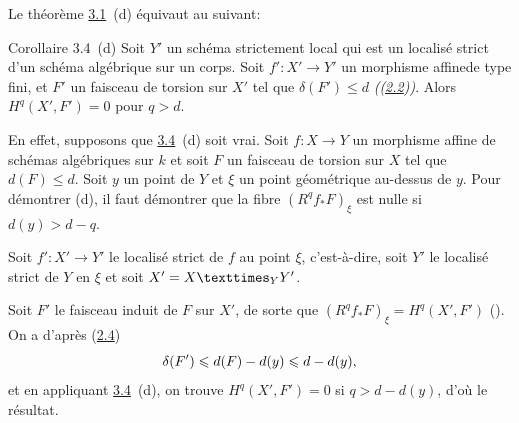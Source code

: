 \documentclass[10pt]{../fichiers-configuration-latex/smfart}
\begin{document}
Le théorème \hyperref[XIV.thm3.1]{3.1}~(d) équivaut
 au suivant:

\begin{enonce*}{Corollaire 3.4~(d)}
Soit $Y'$ un schéma strictement local qui est un localisé strict d'un
schéma algébrique sur un corps. Soit $f':X'\rightarrow Y'$ un
morphisme affine\pageoriginale de type fini, et $F'$ un faisceau de
torsion sur $X'$ tel que $\delta(F')\leq d$ \emph{(\cf (\hyperref[XIV.def2.2]{2.2}))}. Alors
$H^{q}(X',F')=0$ pour $q>d$.
\end{enonce*}

En effet, supposons que \hyperref[XIV.cor3.4]{3.4}~(d) soit vrai. Soit $f:X\rightarrow Y$ un
morphisme affine de schémas algébriques sur $k$ et soit $F$ un
faisceau de torsion sur $X$ tel que $d(F)\leq d$. Soit $y$ un point de
$Y$ et $\xi$ un point géométrique au-dessus de $y$. Pour démontrer 
 (d), 
il faut démontrer que la fibre $(R^{q}f_{\ast}F)_{\xi}$ est nulle
si $d(y)>d-q$.

Soit $f':X'\rightarrow Y'$ le localisé strict de $f$ au point $\xi$,
c'est-à-dire, soit $Y'$ le localisé strict de $Y$ en $\xi$ et soit
$X'=\fprod{X}{Y'}{Y}$.

Soit $F'$ le faisceau induit de $F$ sur $X'$, de sorte que
$(R^{q}f_{\ast}F)_{\xi}=H^{q}(X',F')$ (). 
{On a d'après (\hyperref[XIV.prop2.4]{2.4})
$$
\delta(F')\leqslant d(F)-d(y)\leqslant d-d(y){},
$$}
et en appliquant \hyperref[XIV.cor3.4]{3.4}~(d), on trouve $H^{q}(X',F')=0$ si $q>d-d(y)$,
d'où le résultat.
\end{document}
